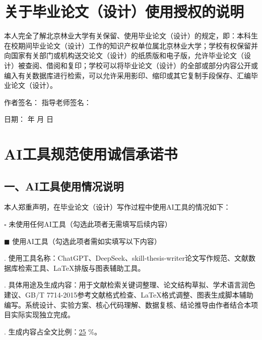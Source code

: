 \documentclass[UTF8,zihao=-4,scheme=chinese,fontset=none]{ctexart}
\begin{document}
\vspace{2.5cm}
\section*{关于毕业论文（设计）使用授权的说明}
本人完全了解北京林业大学有关保留、使用毕业论文（设计）的规定，即：本科生在校期间毕业论文（设计）工作的知识产权单位属北京林业大学；学校有权保留并向国家有关部门或机构送交论文（设计）的纸质版和电子版，允许毕业论文（设计）被查阅、借阅和复印；学校可以将毕业论文（设计）的全部或部分内容公开或编入有关数据库进行检索，可以允许采用影印、缩印或其它复制手段保存、汇编毕业论文（设计）。

\vspace{1.5cm}
\noindent 作者签名：\hspace{4cm} 指导老师签名：\hspace{2cm}

\vspace{0.8cm}
\noindent 日\quad 期：\hspace{1cm} 年 \hspace{0.5cm} 月 \hspace{0.5cm} 日

\clearpage
\thispagestyle{empty}
\section*{AI工具规范使用诚信承诺书}
\subsection*{一、AI工具使用情况说明}
本人郑重声明，在毕业论文（设计）写作过程中使用AI工具的情况如下：

\vspace{0.4cm}
\noindent $\square$ 未使用任何AI工具（勾选此项者无需填写后续内容）

\noindent $\blacksquare$ 使用AI工具（勾选此项者需如实填写以下内容）

\vspace{0.4cm}
. 使用工具名称：ChatGPT、DeepSeek、skill-thesis-writer论文写作规范、文献数据库检索工具、LaTeX排版与图表辅助工具。

. 具体用途及生成内容：用于文献检索关键词整理、论文结构草拟、学术语言润色建议、GB/T 7714-2015参考文献格式检查、LaTeX格式调整、图表生成脚本辅助编写。系统设计、实验方案、核心代码理解、数据复核、结论推导由作者结合本项目实际实现独立完成。

. 生成内容占全文比例：\underline{\hspace{1.5cm}25\hspace{0.3cm}} \%。
\end{document}
